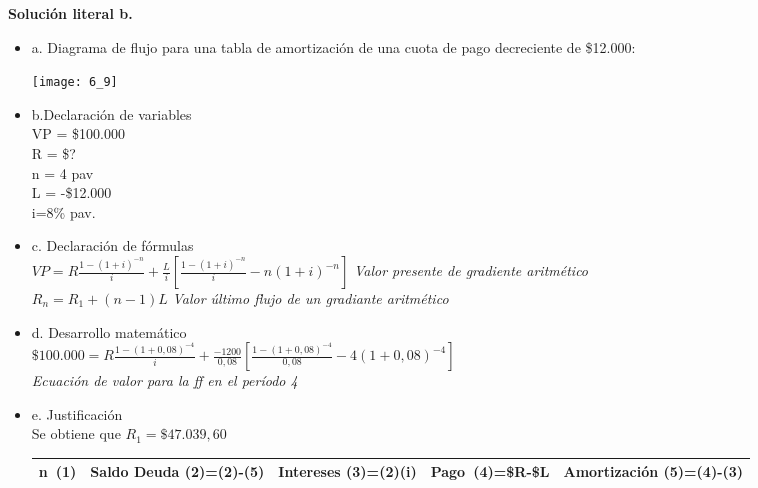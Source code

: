 \begin{itemize}
\begin{center}
\begin{tabular}{|p{1cm}|p{2cm}|p{2cm}|p{2cm}|p{3cm}|}
 
\end{tabular}
\end{center}
		
		\begin{flushleft}
             \textbf{Solución literal b.}\\
        \end{flushleft}
        \begin{itemize}
		   \item a. Diagrama de flujo para una tabla de amortización de una cuota de pago decreciente de \$12.000:
			\begin{center}
				\texttt{[image: 6\_9]}
			\end{center}
			\item b.Declaración de variables\\
			VP = \$100.000\\
			R = \$?\\
			n = 4 pav\\ L = -\$12.000\\ i=8\% pav.
			\item c. Declaración de fórmulas\\
			$VP = R	\frac{1-(1+i)^{-n}}{i}+\frac{L}{i}[\frac{1-(1+i)^{-n}}{i}- n(1+i)^{-n}]$ \hspace{10 pt} \textit{Valor presente de gradiente aritmético}\\
			$R_{n} = R_{1} + (n-1)L$\hspace{20 pt} \textit{Valor último flujo de un gradiante aritmético}\\
			\item d. Desarrollo matemático\\
			$\$100.000 = R	\frac{1-(1+0,08)^{-4}}{i}+\frac{-1200}{0,08}[\frac{1-(1+0,08)^{-4}}{0,08}- 4(1+0,08)^{-4}]$ \\ \textit{Ecuación de valor para la ff en el período 4}\\
			\item e. Justificación\\
			Se obtiene que $R_{1} = \$47.039,60$\\
			
\begin{spacing}{1.1}
    \begin{center}
        \begin{tabular}{|p{1cm}|p{2cm}|p{2cm}|p{2cm}|p{3cm}|}
        \hline 
        \rowcolor{white!50}
            \textbf{n\ (1)} & \textbf{Saldo Deuda (2)=(2)-(5)} & \textbf{Intereses  (3)=(2)(i)}& \textbf{Pago\ (4)=\$R-\$L }& \textbf{Amortización  (5)=(4)-(3)} \\ \hline                        


\end{tabular}
\end{center}
\end{spacing}
\end{itemize}
\end{itemize}
